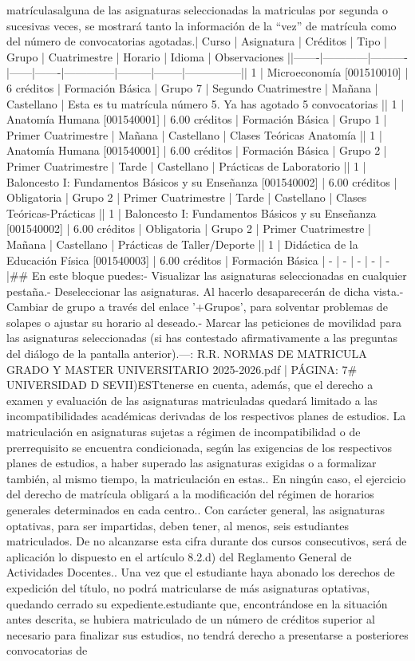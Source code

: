 \documentclass{article}
\begin{document}
\begin{itemize}
{{matrículas\n\nSi alguna de las asignaturas seleccionadas la matriculas por segunda o sucesivas veces, se mostrará tanto la información de la “vez” de matrícula como del número de convocatorias agotadas.\n\n| Curso | Asignatura | Créditos | Tipo | Grupo | Cuatrimestre | Horario | Idioma | Observaciones |\n|-------|------------|----------|------|-------|--------------|---------|--------|---------------|\n| 1     | Microeconomía [001510010] | 6 créditos | Formación Básica | Grupo 7 | Segundo Cuatrimestre | Mañana | Castellano | Esta es tu matrícula número 5. Ya has agotado 5 convocatorias |\n| 1     | Anatomía Humana [001540001] | 6.00 créditos | Formación Básica | Grupo 1 | Primer Cuatrimestre | Mañana | Castellano | Clases Teóricas Anatomía |\n| 1     | Anatomía Humana [001540001] | 6.00 créditos | Formación Básica | Grupo 2 | Primer Cuatrimestre | Tarde | Castellano | Prácticas de Laboratorio |\n| 1     | Baloncesto I: Fundamentos Básicos y su Enseñanza [001540002] | 6.00 créditos | Obligatoria | Grupo 2 | Primer Cuatrimestre | Tarde | Castellano | Clases Teóricas-Prácticas |\n| 1     | Baloncesto I: Fundamentos Básicos y su Enseñanza [001540002] | 6.00 créditos | Obligatoria | Grupo 2 | Primer Cuatrimestre | Mañana | Castellano | Prácticas de Taller/Deporte |\n| 1     | Didáctica de la Educación Física [001540003] | 6.00 créditos | Formación Básica | - | - | - | - | - |\n\n## En este bloque puedes:\n\n- Visualizar las asignaturas seleccionadas en cualquier pestaña.\n- Deseleccionar las asignaturas. Al hacerlo desaparecerán de dicha vista.\n- Cambiar de grupo a través del enlace '+Grupos', para solventar problemas de solapes o ajustar su horario al deseado.\n- Marcar las peticiones de movilidad para las asignaturas seleccionadas (si has contestado afirmativamente a las preguntas del diálogo de la pantalla anterior).\n\n---\n\nFUENTE: R.R. NORMAS DE MATRICULA GRADO Y MASTER UNIVERSITARIO 2025-2026.pdf | PÁGINA: 7\n# UNIVERSIDAD D SEVII\n\nC)EST\n{} tenerse en cuenta, además, que el derecho a examen y evaluación de las asignaturas matriculadas quedará limitado a las incompatibilidades académicas derivadas de los respectivos planes de estudios. La matriculación en asignaturas sujetas a régimen de incompatibilidad o de prerrequisito se encuentra condicionada, según las exigencias de los respectivos planes de estudios, a haber superado las asignaturas exigidas o a formalizar también, al mismo tiempo, la matriculación en estas.\n{}. En ningún caso, el ejercicio del derecho de matrícula obligará a la modificación del régimen de horarios generales determinados en cada centro.\n{}. Con carácter general, las asignaturas optativas, para ser impartidas, deben tener, al menos, seis estudiantes matriculados. De no alcanzarse esta cifra durante dos cursos consecutivos, será de aplicación lo dispuesto en el artículo 8.2.d) del Reglamento General de Actividades Docentes.\n{}. Una vez que el estudiante haya abonado los derechos de expedición del título, no podrá matricularse de más asignaturas optativas, quedando cerrado su expediente.\n\nEl estudiante que, encontrándose en la situación antes descrita, se hubiera matriculado de un número de créditos superior al necesario para finalizar sus estudios, no tendrá derecho a presentarse a posteriores convocatorias de }}
\end{itemize}
\end{document}
